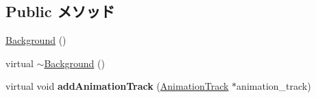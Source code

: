 \subsection*{Public メソッド}
\begin{CompactItemize}
\item 
\hyperlink{classm3g_1_1Background_2bbc220bb63956558a8603a7909c2bbd}{Background} ()
\item 
virtual \hyperlink{classm3g_1_1Background_b793cb50870532320856acdd2caf84c3}{$\sim$Background} ()
\item 
\hypertarget{classm3g_1_1Background_415c0b110f95410ded9b85e5d99a496b}{
virtual void \textbf{addAnimationTrack} (\hyperlink{classm3g_1_1AnimationTrack}{AnimationTrack} $\ast$animation\_\-track)}
\label{classm3g_1_1Background_415c0b110f95410ded9b85e5d99a496b}


\end{CompactItemize}
